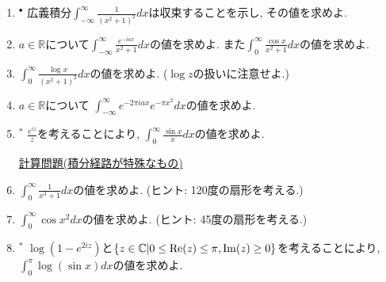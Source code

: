 \documentclass[dvipdfmx,a4paper,11pt]{article}
\newcommand{\R}{\mathbb{R}}
\newcommand{\C}{\mathbb{C}}
\theoremstyle{definition}
\begin{document}
\begin{enumerate}[label=\textbf{問}2.\arabic*]
  \item $^{\bullet}$  広義積分$\int_{ - \infty}^{\infty}\frac{1}{(x^2+ 1)^{2}} dx$は収束することを示し, その値を求めよ.
  
 \item $a \in \R$について$\int_{- \infty}^{\infty}\frac{e^{-iax}}{x^2+1} dx$の値を求めよ. また$\int_{0}^{\infty}\frac{\cos x}{x^2 + 1} dx$の値を求めよ.
 
  \item $\int_{0}^{\infty} \frac{\log x}{(x^2 + 1)^2} dx$の値を求めよ. ($\log z$の扱いに注意せよ.)

 \item $a \in \R$について $\int_{- \infty}^{\infty} e^{-2 \pi i a x } e^{- \pi x^2}dx$の値を求めよ.
 
\item   $^{*}$ $\frac{e^{iz}}{z}$を考えることにより, $\int_{0}^{\infty}\frac{\sin x}{x} dx$の値を求めよ.
        
 \newpage 
  \vspace{12pt}
\hspace{-36pt}\underline{計算問題(積分経路が特殊なもの)}

   \item  $\int_{0}^{\infty}\frac{1}{x^3+ 1} dx$の値を求めよ. (ヒント: 120度の扇形を考える.)
   
\item $\int_{0}^{\infty}\cos x^2 dx$の値を求めよ. (ヒント: 45度の扇形を考える.)

\item $^{*}$  $\log(1-e^{2iz})$と$\{ z \in \C | 0 \le {\rm Re}(z) \le \pi, {\rm Im}(z) \ge 0\}$を考えることにより, $\int_{0}^{\pi}\log (\sin x) dx$の値を求めよ.
 
 \end{enumerate}
\end{document}
